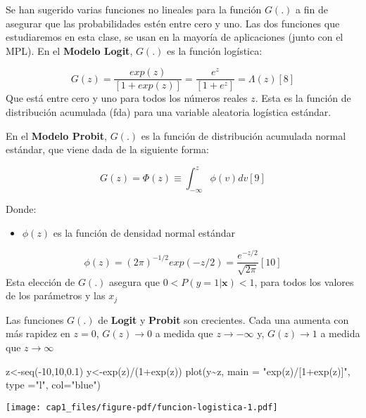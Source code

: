 \documentclass[
  letterpaper,
  DIV=11,
  numbers=noendperiod]{scrreprt}
\newenvironment{Shaded}{\begin{snugshade}}{\end{snugshade}}
\newcommand{\AttributeTok}[1]{\textcolor[rgb]{0.40,0.45,0.13}{#1}}
\newcommand{\DecValTok}[1]{\textcolor[rgb]{0.68,0.00,0.00}{#1}}
\newcommand{\FloatTok}[1]{\textcolor[rgb]{0.68,0.00,0.00}{#1}}
\newcommand{\FunctionTok}[1]{\textcolor[rgb]{0.28,0.35,0.67}{#1}}
\newcommand{\NormalTok}[1]{\textcolor[rgb]{0.00,0.23,0.31}{#1}}
\newcommand{\OtherTok}[1]{\textcolor[rgb]{0.00,0.23,0.31}{#1}}
\newcommand{\SpecialCharTok}[1]{\textcolor[rgb]{0.37,0.37,0.37}{#1}}
\newcommand{\StringTok}[1]{\textcolor[rgb]{0.13,0.47,0.30}{#1}}
\providecommand{\tightlist}{%
  \setlength{\itemsep}{0pt}\setlength{\parskip}{0pt}}\usepackage{longtable,booktabs,array}
\begin{document}
Se han sugerido varias funciones no lineales para la función \(G(.)\) a
fin de asegurar que las probabilidades estén entre cero y uno. Las dos
funciones que estudiaremos en esta clase, se usan en la mayoría de
aplicaciones (junto con el MPL). En el \textbf{Modelo Logit}, \(G(.)\)
es la función logística:

\[G(z)=\frac{exp(z)}{[1+exp(z)]}=\frac{e^z}{[1+e^z]}=\Lambda(z) [8]\]
Que está entre cero y uno para todos los números reales \(z\). Esta es
la función de distribución acumulada (fda) para una variable aleatoria
logística estándar.

En el \textbf{Modelo Probit}, \(G(.)\) es la función de distribución
acumulada normal estándar, que viene dada de la siguiente forma:

\[G(z)=\Phi(z)\equiv\int_{-\infty}^z \phi(v)dv[9]\]

Donde:

\begin{itemize}
\tightlist
\item
  \(\phi(z)\) es la función de densidad normal estándar
\end{itemize}

\[\phi(z)=(2\pi)^{-1/2}exp(-z/2)=\frac{e^{-z/2}}{\sqrt{2\pi}}[10]\] Esta
elección de \(G(.)\) asegura que \(0<P(y=1|\mathbf{x})<1\), para todos
los valores de los parámetros y las \(x_j\)

Las funciones \(G(.)\) de \textbf{Logit} y \textbf{Probit} son
crecientes. Cada una aumenta con más rapidez en \(z=0\),
\(G(z)\rightarrow 0\) a medida que \(z\rightarrow -\infty\) y,
\(G(z)\rightarrow 1\) a medida que \(z\rightarrow \infty\)

\begin{Shaded}
\begin{Highlighting}[]
\NormalTok{z}\OtherTok{\textless{}{-}}\FunctionTok{seq}\NormalTok{(}\SpecialCharTok{{-}}\DecValTok{10}\NormalTok{,}\DecValTok{10}\NormalTok{,}\FloatTok{0.1}\NormalTok{)}
\NormalTok{y}\OtherTok{\textless{}{-}}\FunctionTok{exp}\NormalTok{(z)}\SpecialCharTok{/}\NormalTok{(}\DecValTok{1}\SpecialCharTok{+}\FunctionTok{exp}\NormalTok{(z))}
\FunctionTok{plot}\NormalTok{(y}\SpecialCharTok{\textasciitilde{}}\NormalTok{z, }
     \AttributeTok{main =} \StringTok{"exp(z)/[1+exp(z)]"}\NormalTok{, }
     \AttributeTok{type =}\StringTok{"l"}\NormalTok{, }\AttributeTok{col=}\StringTok{"blue"}\NormalTok{)}
\end{Highlighting}
\end{Shaded}

\texttt{[image: cap1\_files/figure-pdf/funcion-logistica-1.pdf]}
\end{document}
